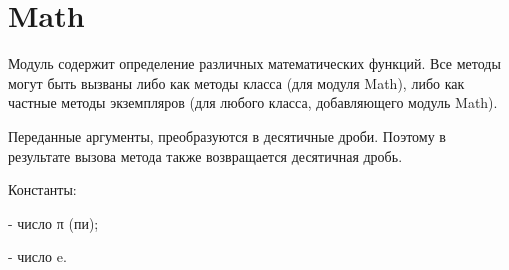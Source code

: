 \section{Math}

Модуль содержит определение различных математических функций. Все методы могут быть вызваны либо как методы класса (для модуля Math), либо как частные методы экземпляров (для любого класса, добавляющего модуль Math).

Переданные аргументы, преобразуются в десятичные дроби. Поэтому в результате вызова метода также возвращается десятичная дробь.

\begin{keylist}{Константы:}
  
   - число π (пи);
  
   - число e.
\end{keylist}

